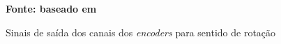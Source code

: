 \begin{figure}[ht]
	\centering
	\caption{Sinais de saída dos canais dos \textit{encoders} para sentido de rotação}		
	\label{fig:ImagemOdometria}
	\textbf{Fonte: baseado em }
\end{figure}